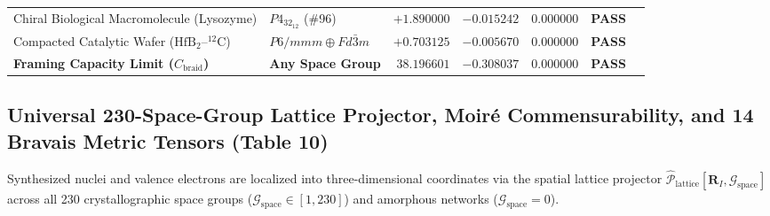 \documentclass[11pt,onecolumn]{article}
\begin{document}
\begin{table}[!htbp]
{\begin{tabular}{@{}llrrrrr@{}}
Chiral Biological Macromolecule (Lysozyme) & $P4_32_12$ (\#96) & $+1.890000$ & $-0.015242$ & $\mathbf{0.000000}$ & \textbf{PASS} \\
Compacted Catalytic Wafer ($\text{HfB}_2\text{--}^{12}\text{C}$) & $P6/mmm \oplus Fd\bar{3}m$ & $+0.703125$ & $-0.005670$ & $\mathbf{0.000000}$ & \textbf{PASS} \\
\midrule
\textbf{Framing Capacity Limit ($C_{\text{braid}}$)} & \textbf{Any Space Group} & $\mathbf{38.196601}$ & $\mathbf{-0.308037}$ & $\mathbf{0.000000}$ & \textbf{PASS} \\
\bottomrule
\end{tabular}%
}
\end{table}
\FloatBarrier
\subsection{Universal 230-Space-Group Lattice Projector, Moir\'e Commensurability, and 14 Bravais Metric Tensors (Table 10)}
Synthesized nuclei and valence electrons are localized into three-dimensional coordinates via the spatial lattice projector $\hat{\mathcal{P}}_{\text{lattice}}[\mathbf{R}_I, \mathcal{G}_{\text{space}}]$ across all 230 crystallographic space groups ($\mathcal{G}_{\text{space}} \in [1, 230]$) and amorphous networks ($\mathcal{G}_{\text{space}} = 0$).
\end{document}
